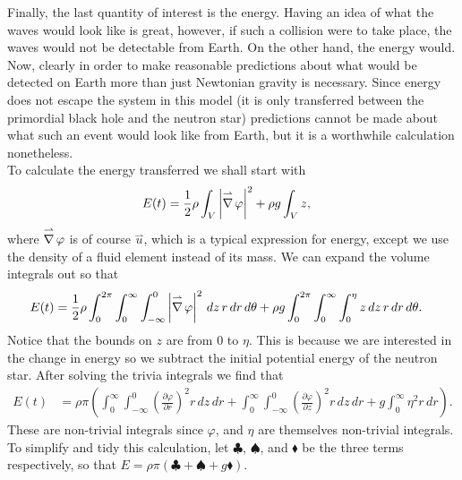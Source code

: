 Finally, the last quantity of interest is the energy. Having an idea of what the waves would look like is great, however, if such a collision were to take place, the waves would not be detectable from Earth. On the other hand, the energy would. Now, clearly in order to make reasonable predictions about what would be detected on Earth more than just Newtonian gravity is necessary. Since energy does not escape the system in this model (it is only transferred between the primordial black hole and the neutron star) predictions cannot be made about what such an event would look like from Earth, but it is a worthwhile calculation nonetheless. \\

To calculate the energy transferred we shall start with
\begin{align*}
E(t) &= \frac{1}{2} \rho \int_V \left| \operatorname{\overset{\rightharpoonup}\nabla} \varphi \right|^2 + \rho g \int_V z,
\end{align*}
where $\operatorname{\overset{\rightharpoonup}\nabla} \varphi$ is of course $\overset{\rightharpoonup}u$, which is a typical expression for energy, except we use the density of a fluid element instead of its mass. We can expand the volume integrals out so that 
\begin{align*}
E(t) &= \frac{1}{2} \rho \int_0^{2\pi} \int_0^\infty \int_{-\infty}^0 \left| \operatorname{\overset{\rightharpoonup}\nabla} \varphi \right|^2 \, dz \, r \, dr \, d\theta + \rho g \int_0^{2\pi} \int_0^\infty \int_0^\eta z \, dz \, r \, dr \, d\theta.
\end{align*}
Notice that the bounds on $z$ are from $0$ to $\eta$. This is because we are interested in the change in energy so we subtract the initial potential energy of the neutron star. After solving the trivia integrals we find that
\begin{align*}
E(t) &= \rho \pi \left( \int_0^\infty \int_{-\infty}^0 \left( \frac{\partial \varphi}{\partial r} \right)^2 r \, dz \, dr + \int_0^\infty \int_{-\infty}^0 \left( \frac{\partial \varphi}{\partial z} \right)^2 r \, dz \, dr + g \int_0^\infty \eta^2 r \, dr \right).
\end{align*}
These are non-trivial integrals since $\varphi$, and $\eta$ are themselves non-trivial integrals. To simplify and tidy this calculation, let $\clubsuit$, $\spadesuit$, and $\blacklozenge$ be the three terms respectively, so that $E = \rho \pi (\clubsuit + \spadesuit + g \blacklozenge)$. \\


